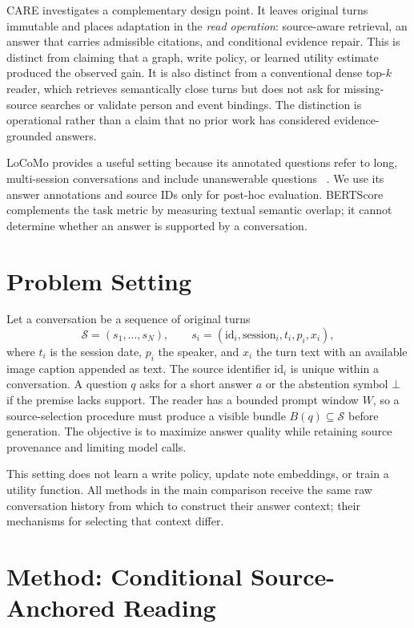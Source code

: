 \documentclass[11pt]{article}
\newcommand{\care}{\textsc{CARE}}
\newcommand{\botans}{\bot}
\newcommand{\sources}{\mathcal{S}}
\begin{document}
\care{} investigates a complementary design point. It leaves original turns
immutable and places adaptation in the \emph{read operation}: source-aware
retrieval, an answer that carries admissible citations, and conditional
evidence repair. This is distinct from claiming that a graph, write policy,
or learned utility estimate produced the observed gain. It is also distinct
from a conventional dense top-$k$ reader, which retrieves semantically close
turns but does not ask for missing-source searches or validate person and
event bindings. The distinction is operational rather than a claim that no
prior work has considered evidence-grounded answers.

LoCoMo provides a useful setting because its annotated questions refer to
long, multi-session conversations and include unanswerable questions
~\cite{maharana2024locomo}. We use its answer annotations and source IDs
only for post-hoc evaluation. BERTScore~\cite{zhang2020bertscore} complements
the task metric by measuring textual semantic overlap; it cannot determine
whether an answer is supported by a conversation.

\section{Problem Setting}
\label{sec:setting}

Let a conversation be a sequence of original turns
\begin{equation}
\sources = (s_1,\ldots,s_N),\qquad
s_i=(\mathrm{id}_i,\mathrm{session}_i,t_i,p_i,x_i),
\label{eq:source}
\end{equation}
where $t_i$ is the session date, $p_i$ the speaker, and $x_i$ the turn text
with an available image caption appended as text. The source identifier
$\mathrm{id}_i$ is unique within a conversation. A question $q$ asks for a
short answer $a$ or the abstention symbol $\botans$ if the premise lacks
support. The reader has a bounded prompt window $W$, so a source-selection
procedure must produce a visible bundle $B(q)\subseteq\sources$ before
generation. The objective is to maximize answer quality while retaining
source provenance and limiting model calls.

This setting does not learn a write policy, update note embeddings, or train
a utility function.
All methods in the main comparison receive the same raw conversation history
from which to construct their answer context; their mechanisms for selecting
that context differ.

\section{Method: Conditional Source-Anchored Reading}
\label{sec:method}
\end{document}
